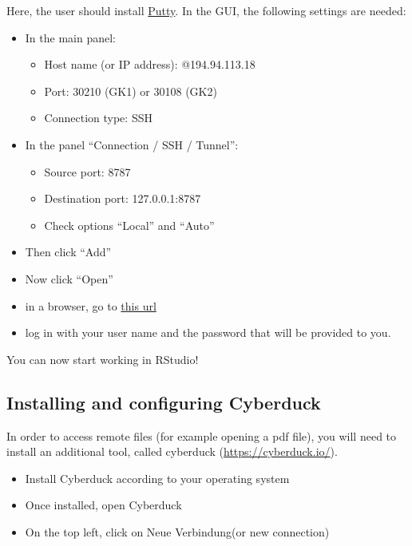 \documentclass[
]{book}
\providecommand{\tightlist}{%
  \setlength{\itemsep}{0pt}\setlength{\parskip}{0pt}}
\begin{document}
Here, the user should install \href{https://www.putty.org/}{Putty}.
In the GUI, the following settings are needed:

\begin{itemize}
\tightlist
\item
  In the main panel:

  \begin{itemize}
  \tightlist
  \item
    Host name (or IP address): @194.94.113.18
  \item
    Port: 30210 (GK1) or 30108 (GK2)
  \item
    Connection type: SSH
  \end{itemize}
\item
  In the panel ``Connection / SSH / Tunnel'':

  \begin{itemize}
  \tightlist
  \item
    Source port: 8787
  \item
    Destination port: 127.0.0.1:8787
  \item
    Check options ``Local'' and ``Auto''
  \end{itemize}
\item
  Then click ``Add''
\item
  Now click ``Open''
\item
  in a browser, go to \href{http://127.0.0.1:8787}{this url}
\item
  log in with your user name and the password that will be provided to you.
\end{itemize}

You can now start working in RStudio!

\hypertarget{installing-and-configuring-cyberduck}{%
\subsection*{Installing and configuring Cyberduck}\label{installing-and-configuring-cyberduck}}

In order to access remote files (for example opening a pdf file), you will need to install an additional tool, called cyberduck (\url{https://cyberduck.io/}).

\begin{itemize}
\tightlist
\item
  Install Cyberduck according to your operating system
\item
  Once installed, open Cyberduck
\item
  On the top left, click on Neue Verbindung(or new connection)
\end{itemize}
\end{document}
